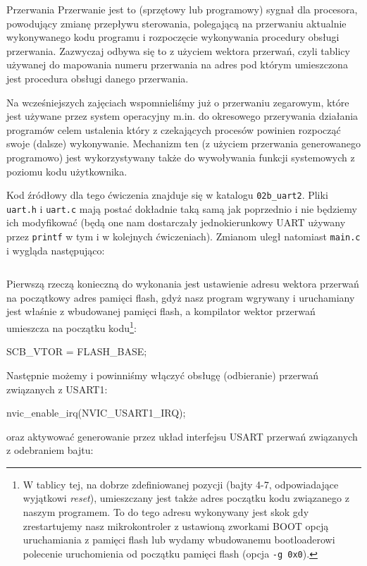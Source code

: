 \documentclass{pdfBooklets}
\begin{document}
\begin{ProTip}{Przerwania}
  Przerwanie jest to (sprzętowy lub programowy) sygnał dla procesora, powodujący zmianę przepływu sterowania, polegającą na przerwaniu aktualnie wykonywanego kodu programu i rozpoczęcie wykonywania procedury obsługi przerwania.
  Zazwyczaj odbywa się to z użyciem wektora przerwań, czyli tablicy używanej do mapowania numeru przerwania na adres pod którym umieszczona jest procedura obsługi danego przerwania.
  
  Na wcześniejszych zajęciach wspomnieliśmy już o przerwaniu zegarowym, które jest używane przez system operacyjny m.in. do okresowego przerywania działania programów celem ustalenia który z czekających procesów powinien rozpocząć swoje (dalsze) wykonywanie.
  Mechanizm ten (z użyciem przerwania generowanego programowo) jest wykorzystywany także do wywoływania funkcji systemowych z poziomu kodu użytkownika.
\end{ProTip}

Kod źródłowy dla tego ćwiczenia znajduje się w katalogu \Verb$02b_uart2$. Pliki \Verb$uart.h$ i \Verb$uart.c$ mają postać dokładnie taką samą jak poprzednio i nie będziemy ich modyfikować (będą one nam dostarczały jednokierunkowy UART używany przez \Verb$printf$ w tym i w kolejnych ćwiczeniach). Zmianom uległ natomiast \Verb$main.c$ i wygląda następująco:

\inputminted[frame=single,firstline=6]{c}{stm32-examples/02b_uart2/main.c}

Pierwszą rzeczą konieczną do wykonania jest ustawienie adresu wektora przerwań na początkowy adres pamięci flash,
	gdyż nasz program wgrywany i uruchamiany jest właśnie z wbudowanej pamięci flash,
	a kompilator wektor przerwań umieszcza na początku kodu\footnote{
		W tablicy tej, na dobrze zdefiniowanej pozycji (bajty 4-7, odpowiadające wyjątkowi \textit{reset}), umieszczany jest także adres początku kodu związanego z naszym programem.
		To do tego adresu wykonywany jest skok gdy zrestartujemy nasz mikrokontroler z ustawioną zworkami BOOT opcją uruchamiania z pamięci flash
			lub wydamy wbudowanemu bootloaderowi polecenie uruchomienia od początku pamięci flash (opcja \Verb$-g 0x0$).
	}:
	
\begin{CodeFrame*}[c]{}
  SCB_VTOR = FLASH_BASE;
\end{CodeFrame*}

Następnie możemy i powinniśmy włączyć obsługę (odbieranie) przerwań związanych z USART1:

\begin{CodeFrame*}[c]{}
  nvic_enable_irq(NVIC_USART1_IRQ);
\end{CodeFrame*}
oraz aktywować generowanie przez układ interfejsu USART przerwań związanych z odebraniem bajtu:
\end{document}
